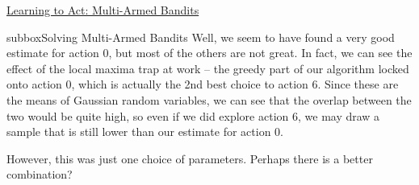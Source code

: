 \begin{textbox}{\href{https://compneuro.neuromatch.io/tutorials/W3D4_ReinforcementLearning/student/W3D4_Tutorial2.html}{Learning to Act: Multi-Armed Bandits } }
\begin{subbox}{subbox}{Solving Multi-Armed Bandits}
Well, we seem to have found a very good estimate for action 0, but most of the others are not great. In fact, we can see the effect of the local maxima trap at work -- the greedy part of our algorithm locked onto action 0, which is actually the 2nd best choice to action 6. Since these are the means of Gaussian random variables, we can see that the overlap between the two would be quite high, so even if we did explore action 6, we may draw a sample that is still lower than our estimate for action 0.

However, this was just one choice of parameters. Perhaps there is a better combination?

\end{subbox}
\end{textbox}
